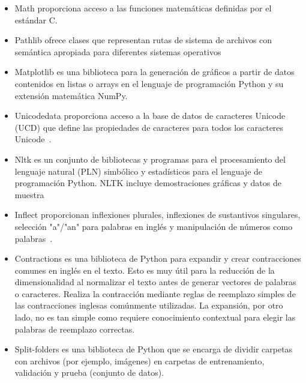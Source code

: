 \documentclass[conference,a4paper]{IEEEtran}
\begin{document}
\begin{itemize}
\item Math proporciona acceso a las funciones matemáticas definidas por el estándar C. ~\cite{b21}

\item Pathlib ofrece clases que representan rutas de sistema de archivos con semántica apropiada para diferentes sistemas operativos~\cite{b22}

\item Matplotlib es una biblioteca para la generación de gráficos a partir de datos contenidos en listas o arrays en el lenguaje de programación Python y su extensión matemática NumPy.  ~\cite{b23}

\item Unicodedata proporciona acceso a la base de datos de caracteres Unicode (UCD) que define las propiedades de caracteres para todos los caracteres Unicode~\cite{b24}.

\item Nltk es un conjunto de bibliotecas y programas para el procesamiento del lenguaje natural (PLN) simbólico y estadísticos para el lenguaje de programación Python. NLTK incluye demostraciones gráficas y datos de muestra~\cite{b25}

\item Inflect proporcionan inflexiones plurales, inflexiones de sustantivos singulares, selección "a"/"an" para palabras en inglés y manipulación de números como palabras~\cite{b26}.

\item Contractions es una biblioteca de Python para expandir y crear contracciones comunes en inglés en el texto. Esto es muy útil para la reducción de la dimensionalidad al normalizar el texto antes de generar vectores de palabras o caracteres. Realiza la contracción mediante reglas de reemplazo simples de las contracciones inglesas comúnmente utilizadas. La expansión, por otro lado, no es tan simple como requiere conocimiento contextual para elegir las palabras de reemplazo correctas.~\cite{b27}

\item Split-folders es una biblioteca de Python que se encarga de dividir carpetas con archivos (por ejemplo, imágenes) en carpetas de entrenamiento, validación y prueba (conjunto de datos). ~\cite{b29}


\end{itemize}
\end{document}
